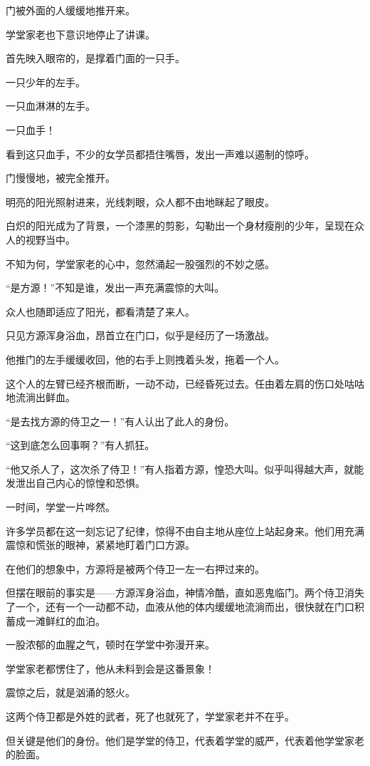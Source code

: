 \begin{this_body}
门被外面的人缓缓地推开来。

学堂家老也下意识地停止了讲课。

首先映入眼帘的，是撑着门面的一只手。

一只少年的左手。

一只血淋淋的左手。

一只血手！

看到这只血手，不少的女学员都捂住嘴唇，发出一声难以遏制的惊呼。

门慢慢地，被完全推开。

明亮的阳光照射进来，光线刺眼，众人都不由地眯起了眼皮。

白炽的阳光成为了背景，一个漆黑的剪影，勾勒出一个身材瘦削的少年，呈现在众人的视野当中。

不知为何，学堂家老的心中，忽然涌起一股强烈的不妙之感。

“是方源！”不知是谁，发出一声充满震惊的大叫。

众人也随即适应了阳光，都看清楚了来人。

只见方源浑身浴血，昂首立在门口，似乎是经历了一场激战。

他推门的左手缓缓收回，他的右手上则拽着头发，拖着一个人。

这个人的左臂已经齐根而断，一动不动，已经昏死过去。任由着左肩的伤口处咕咕地流淌出鲜血。

“是去找方源的侍卫之一！”有人认出了此人的身份。

“这到底怎么回事啊？”有人抓狂。

“他又杀人了，这次杀了侍卫！”有人指着方源，惶恐大叫。似乎叫得越大声，就能发泄出自己内心的惊惶和恐惧。

一时间，学堂一片哗然。

许多学员都在这一刻忘记了纪律，惊得不由自主地从座位上站起身来。他们用充满震惊和慌张的眼神，紧紧地盯着门口方源。

在他们的想象中，方源将是被两个侍卫一左一右押过来的。

但摆在眼前的事实是——方源浑身浴血，神情冷酷，直如恶鬼临门。两个侍卫消失了一个，还有一个一动都不动，血液从他的体内缓缓地流淌而出，很快就在门口积蓄成一滩鲜红的血泊。

一股浓郁的血腥之气，顿时在学堂中弥漫开来。

学堂家老都愣住了，他从未料到会是这番景象！

震惊之后，就是汹涌的怒火。

这两个侍卫都是外姓的武者，死了也就死了，学堂家老并不在乎。

但关键是他们的身份。他们是学堂的侍卫，代表着学堂的威严，代表着他学堂家老的脸面。


\end{this_body}
